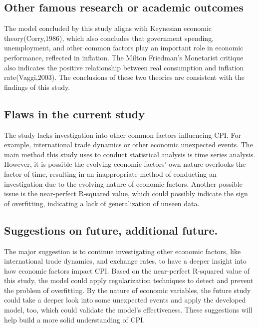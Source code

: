 \documentclass[
  man,floatsintext,
  man]{apa6}
\begin{document}
\subsection{Other famous research or academic outcomes}\label{other-famous-research-or-academic-outcomes}

The model concluded by this study aligns with Keynesian economic theory(Corry,1986), which also concludes that government spending, unemployment, and other common factors play an important role in economic performance, reflected in inflation. The Milton Friedman's Monetarist critique also indicates the positive relationship between real consumption and inflation rate(Vaggi,2003). The conclusions of these two theories are consistent with the findings of this study.

\subsection{Flaws in the current study}\label{flaws-in-the-current-study}

The study lacks investigation into other common factors influencing CPI. For example, international trade dynamics or other economic unexpected events. The main method this study uses to conduct statistical analysis is time series analysis. However, it is possible the evolving economic factors' own nature overlooks the factor of time, resulting in an inappropriate method of conducting an investigation due to the evolving nature of economic factors. Another possible issue is the near-perfect R-squared value, which could possibly indicate the sign of overfitting, indicating a lack of generalization of unseen data.

\subsection{Suggestions on future, additional future.}\label{suggestions-on-future-additional-future.}

The major suggestion is to continue investigating other economic factors, like international trade dynamics, and exchange rates, to have a deeper insight into how economic factors impact CPI. Based on the near-perfect R-squared value of this study, the model could apply regularization techniques to detect and prevent the problem of overfitting. By the nature of economic variables, the future study could take a deeper look into some unexpected events and apply the developed model, too, which could validate the model's effectiveness. These suggestions will help build a more solid understanding of CPI.
\end{document}
